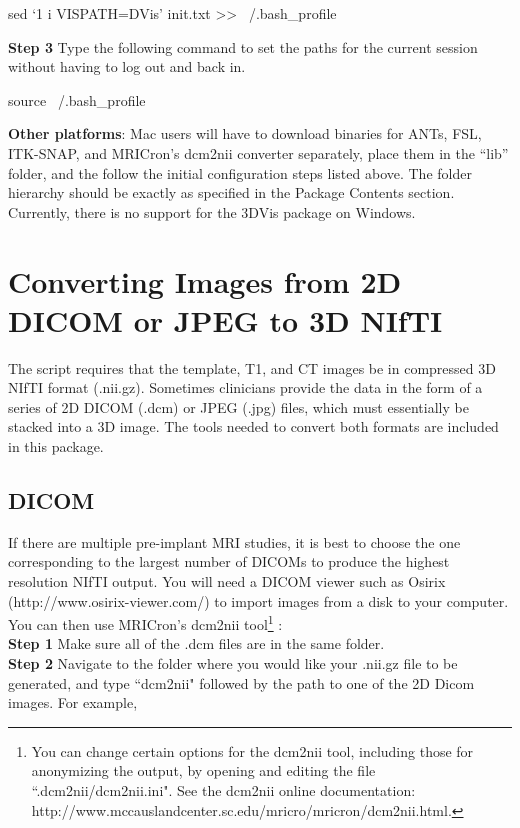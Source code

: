 \documentclass[12pt]{article}
\begin{document}
\begin{verb}
  sed `1 i VISPATH=\mnt\local\gdrive\public\3DVis' init.txt >> ~/.bash_profile
\end{verb}

\textbf{Step 3} Type the following command to set the paths for the current session without having to log out and back in. 

\begin{verb}
  source ~/.bash_profile
\end{verb}

\textbf{Other platforms}: Mac users will have to download binaries for ANTs, FSL, ITK-SNAP, and MRICron's dcm2nii converter separately, place them in the ``lib'' folder, and the follow the initial configuration steps listed above.  The folder hierarchy should be exactly as specified in the Package Contents section. Currently, there is no support for the 3DVis package on Windows.


\section{Converting Images from 2D DICOM or JPEG  to 3D NIfTI}
The script requires that the template, T1, and CT images be in compressed 3D NIfTI format (.nii.gz). Sometimes clinicians provide the data in the form of a series of 2D DICOM (.dcm) or JPEG (.jpg) files, which must essentially be stacked into a 3D image. The tools needed to convert both formats are included in this package.

\subsection*{DICOM}
If there are multiple pre-implant MRI studies, it is best to choose the one corresponding to the largest number of DICOMs to produce the highest resolution NIfTI output. You will need a DICOM viewer such as Osirix (http://www.osirix-viewer.com/) to import images from a disk to your computer. You can then use MRICron's dcm2nii tool\footnote{You can change certain options for the dcm2nii tool, including those for anonymizing the output, by opening and editing the file ``.dcm2nii/dcm2nii.ini".  See the dcm2nii online documentation: http://www.mccauslandcenter.sc.edu/mricro/mricron/dcm2nii.html.} : \\
\textbf{Step 1} Make sure all of the .dcm files are in the same folder. \\
\textbf{Step 2} Navigate to the folder where you would like your .nii.gz file to be generated, and type ``dcm2nii" followed by the path to one of the 2D Dicom images. For example, 
\end{document}
